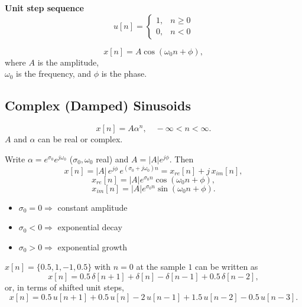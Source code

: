 \documentclass[handout_subfiles_root.tex]{subfiles}
\begin{document}
\textbf{Unit step sequence}
$$u[n] = \begin{cases}1, & n\ge 0\\ 0, & n<0\end{cases}$$

\begin{center}
\end{center}


$$x[n] = A\cos(\omega_0 n + \phi),$$
\noindent where $A$ is the amplitude,\\
$\omega_0$ is the frequency, and $\phi$ is the phase.

\subsection{Complex (Damped) Sinusoids}

$$x[n] = A\alpha^n, \quad -\infty < n < \infty.$$
\noindent $A$ and $\alpha$ can be real or complex.

\noindent Write $\alpha = e^{\sigma_0}e^{j\omega_0}$ ($\sigma_0,\omega_0$ real) and $A = |A|e^{j\phi}$. Then
$$x[n] = |A|\,e^{j\phi}\,e^{(\sigma_0+j\omega_0)n} = x_{re}[n] + j\,x_{im}[n],$$
$$x_{re}[n] = |A|e^{\sigma_0 n}\cos(\omega_0 n + \phi),$$
$$x_{im}[n] = |A|e^{\sigma_0 n}\sin(\omega_0 n + \phi).$$
\begin{itemize}
  \item $\sigma_0 = 0 \Rightarrow$ constant amplitude
  \item $\sigma_0 < 0 \Rightarrow$ exponential decay
  \item $\sigma_0 > 0 \Rightarrow$ exponential growth
\end{itemize}


\begin{examplebox}[title={Example}]
$x[n] = \{0.5, 1, -1, 0.5\}$ with $n=0$ at the sample $1$ can be written as
$$x[n] = 0.5\,\delta[n+1] + \delta[n] - \delta[n-1] + 0.5\,\delta[n-2],$$
or, in terms of shifted unit steps,
$$x[n] = 0.5\,u[n+1] + 0.5\,u[n] - 2\,u[n-1] + 1.5\,u[n-2] - 0.5\,u[n-3].$$
\end{examplebox}
\end{document}
